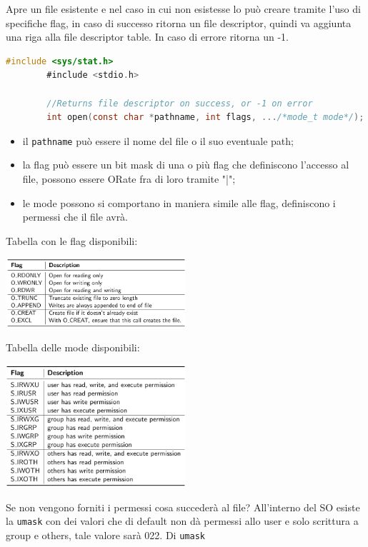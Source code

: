 \documentclass[a4paper, 12pt]{book}
\begin{document}
    Apre un file esistente e nel caso in cui non esistesse 
    lo può creare tramite l'uso di specifiche flag, in caso di 
    successo ritorna un file descriptor, quindi va aggiunta 
    una riga alla file descriptor table. In caso di errore
    ritorna un -1.
    \begin{lstlisting}[language=C]
        #include <sys/stat.h>
        #include <stdio.h>

        //Returns file descriptor on success, or -1 on error 
        int open(const char *pathname, int flags, .../*mode_t mode*/);
    \end{lstlisting}
    \begin{itemize}
        \item il \verb|pathname| può essere il nome del file o il suo eventuale path;
        \item la flag può essere un bit mask di una o più flag che definiscono l'accesso al file, possono essere ORate fra di loro tramite "|";
        \item le mode possono si comportano in maniera simile alle flag, definiscono i permessi che il file avrà.
    \end{itemize}
    Tabella con le flag disponibili:
    \begin{center}
        \includegraphics[width=0.5\textwidth]{flag_open.png}
    \end{center}
    Tabella delle mode disponibili:
    \begin{center}
        \includegraphics[width=0.5\textwidth]{mode_open.png}
    \end{center}
    Se non vengono forniti i permessi cosa succederà al file?
    All'interno del SO esiste la \verb|umask| con dei valori che 
    di default non dà permessi allo user e solo scrittura
    a group e others, tale valore sarà 022. Di \verb|umask|
\end{document}
